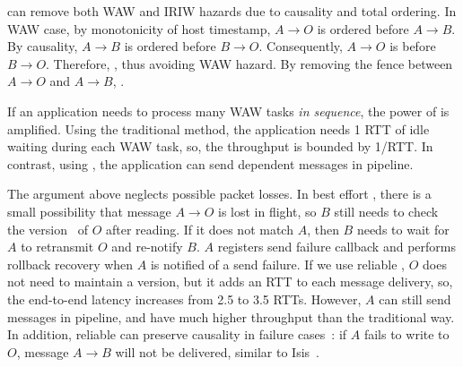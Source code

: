 
\sys{} can remove both WAW and IRIW hazards due to causality and total ordering.
In WAW case, by monotonicity of host timestamp, $A \rightarrow O$ is ordered before $A \rightarrow B$. By causality, $A \rightarrow B$ is ordered before $B \rightarrow O$. Consequently, $A \rightarrow O$ is  before $B \rightarrow O$. Therefore, , thus avoiding WAW hazard.
By removing the fence between $A \rightarrow O$ and $A \rightarrow B$, .



If an application needs to process many WAW tasks \emph{in sequence}, the power of \sys{} is amplified. Using the traditional method, the application needs 1 RTT of idle waiting during each WAW task, so, the throughput is bounded by 1/RTT. In contrast, using \sys{}, the application can send dependent messages in pipeline. %

The argument above neglects possible packet losses.
In best effort \sys{}, there is a small possibility that message $A \rightarrow O$ is lost in flight, so $B$ still needs to check the version~ of $O$ after reading. If it does not match $A$, then $B$ needs to wait for $A$ to retransmit $O$ and re-notify $B$.
$A$ registers send failure callback and performs rollback recovery when $A$ is notified of a send failure.
If we use reliable \sys{}, $O$ does not need to maintain a version, but it adds an RTT to each message delivery, so, the end-to-end latency increases from 2.5 to 3.5 RTTs. However, $A$ can still send messages in pipeline, and have much higher throughput than the traditional way.
In addition, reliable \sys can preserve causality in failure cases~\cite{birman1994response}: if $A$ fails to write to $O$, message $A \rightarrow B$ will not be delivered, similar to Isis~\cite{birman1984overview}.

